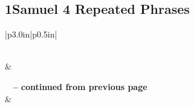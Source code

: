 \subsection{1Samuel 4 Repeated Phrases}


\normalsize
 
\begin{center}
\begin{longtable}{|p{3.0in}|p{0.5in}|}
\caption[1Samuel 4 Repeated Phrases]{1Samuel 4 Repeated Phrases}\label{table:Repeated Phrases 1Samuel 4} \\
\hline {} &  \\ \hline 
\endfirsthead
 
{{\bfseries \tablename\ \thetable{} -- continued from previous page}} \\  
\hline {} &  \\ \hline 
\endhead
 

\end{longtable}
\end{center}
